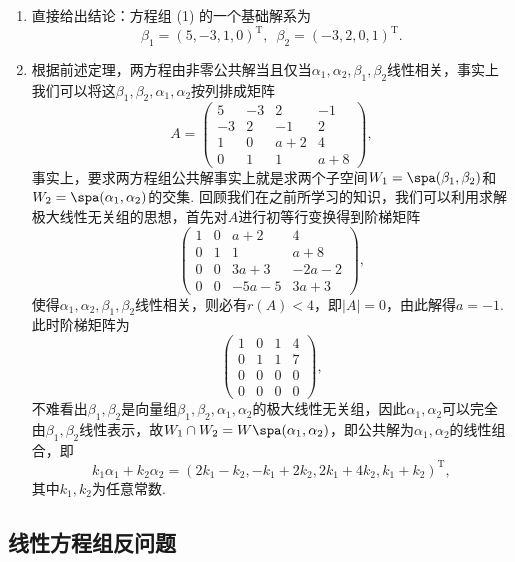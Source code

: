 \begin{solution}
    \begin{enumerate}
        \item 直接给出结论：方程组 (1) 的一个基础解系为
              \[\beta_1=(5,-3,1,0)^{\mathrm{T}},\enspace\beta_2=(-3,2,0,1)^{\mathrm{T}}.\]
        \item 根据前述定理，两方程由非零公共解当且仅当$\alpha_1,\alpha_2,\beta_1,\beta_2$线性相关，事实上我们可以将这$\beta_1,\beta_2,\alpha_1,\alpha_2$按列排成矩阵
        \[A=\begin{pmatrix}
            5 & -3 & 2 & -1 \\ -3 & 2 & -1 & 2 \\ 1 & 0 & a+2 & 4 \\ 0 & 1 & 1 & a+8
        \end{pmatrix},\]
        事实上，要求两方程组公共解事实上就是求两个子空间$W_1=\spa(\beta_1,\beta_2)$和$W_2=\spa(\alpha_1,\alpha_2)$的交集. 回顾我们在之前所学习的知识，我们可以利用求解极大线性无关组的思想，首先对$A$进行初等行变换得到阶梯矩阵
        \[\begin{pmatrix}
            1 & 0 & a+2 & 4 \\ 0 & 1 & 1 & a+8 \\ 0 & 0 & 3a+3 & -2a-2 \\ 0 & 0 & -5a-5 & 3a+3
        \end{pmatrix},\]
        使得$\alpha_1,\alpha_2,\beta_1,\beta_2$线性相关，则必有$r(A)<4$，即$|A|=0$，由此解得$a=-1$.此时阶梯矩阵为
        \[\begin{pmatrix}
            1 & 0 & 1 & 4 \\ 0 & 1 & 1 & 7 \\ 0 & 0 & 0 & 0 \\ 0 & 0 & 0 & 0
        \end{pmatrix},\]
        不难看出$\beta_1,\beta_2$是向量组$\beta_1,\beta_2,\alpha_1,\alpha_2$的极大线性无关组，因此$\alpha_1,\alpha_2$可以完全由$\beta_1,\beta_2$线性表示，故$W_1\cap W_2=W\spa(\alpha_1,\alpha_2)$，即公共解为$\alpha_1,\alpha_2$的线性组合，即
        \[k_1\alpha_1+k_2\alpha_2=(2k_1-k_2,-k_1+2k_2,2k_1+4k_2,k_1+k_2)^\mathrm{T},\]
        其中$k_1,k_2$为任意常数.
    \end{enumerate}
\end{solution}

\subsection{线性方程组反问题}

